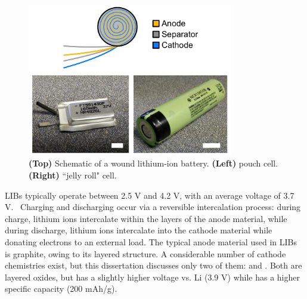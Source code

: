 \begin{figure}[htb]
  \centering
    \includegraphics[width=0.8\textwidth]{ch2-pastwork/images/libgeom.png}
    \caption[Lithium-ion battery geometries.]{\textbf{(Top)} Schematic of a wound lithium-ion battery. \textbf{(Left)}  pouch cell.\textbf{(Right)}  ``jelly roll" cell.}
    \label{fig:libgeom}
\end{figure}

LIBs typically operate between 2.5 V and 4.2 V, with an average voltage of 3.7 V.~\cite{linden} Charging and discharging occur via a reversible intercalation process: during charge, lithium ions intercalate within the layers of the anode material, while during discharge, lithium ions intercalate into the cathode material while donating electrons to an external load. The typical anode material used in LIBs is graphite, owing to its layered structure. A considerable number of cathode chemistries exist, but this dissertation discusses only two of them:  and . Both are layered oxides, but  has a slightly higher voltage vs. Li (3.9 V) while  has a higher specific capacity (200 mAh/g).~\cite{linden} 


